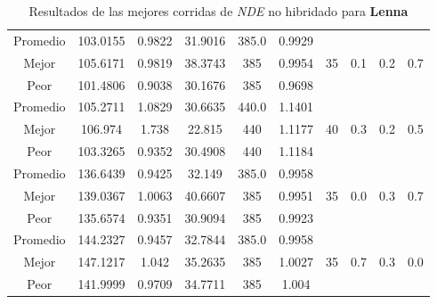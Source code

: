 \begin{table}[h!]
\begin{center}
\begin{tabular}{|c|c|c|c|c|c|c|c|c|c|}
        \hline
        \hline
            Promedio  & 103.0155 & 0.9822 & 31.9016 & 385.0 & 0.9929 &  &  &  & \\
            \cline{1-6}
            Mejor & 105.6171 & 0.9819  & 38.3743 & 385 & 0.9954 & 35 & 0.1 & 0.2 & 0.7\\
            \cline{1-6}
            Peor & 101.4806 & 0.9038  & 30.1676 & 385 & 0.9698 &  &  &  & \\
        \hline
        \hline
            Promedio  & 105.2711 & 1.0829 & 30.6635 & 440.0 & 1.1401 &  &  &  & \\
            \cline{1-6}
            Mejor & 106.974 & 1.738  & 22.815 & 440 & 1.1177 & 40 & 0.3 & 0.2 & 0.5\\
            \cline{1-6}
            Peor & 103.3265 & 0.9352  & 30.4908 & 440 & 1.1184 &  &  &  & \\
        \hline
        \hline
            Promedio  & 136.6439 & 0.9425 & 32.149 & 385.0 & 0.9958 &  &  &  & \\
            \cline{1-6}
            Mejor & 139.0367 & 1.0063  & 40.6607 & 385 & 0.9951 & 35 & 0.0 & 0.3 & 0.7\\
            \cline{1-6}
            Peor & 135.6574 & 0.9351  & 30.9094 & 385 & 0.9923 &  &  &  & \\
        \hline
        \hline
            Promedio  & 144.2327 & 0.9457 & 32.7844 & 385.0 & 0.9958 &  &  &  & \\
            \cline{1-6}
            Mejor & 147.1217 & 1.042  & 35.2635 & 385 & 1.0027 & 35 & 0.7 & 0.3 & 0.0\\
            \cline{1-6}
            Peor & 141.9999 & 0.9709  & 34.7711 & 385 & 1.004 &  &  &  & \\
        \hline
        \end{tabular}
        \caption{Resultados de las mejores corridas de \emph{NDE} no hibridado para {\bf Lenna}}
        \label{tb:tabledealgimg}
    \end{center}
\end{table}


